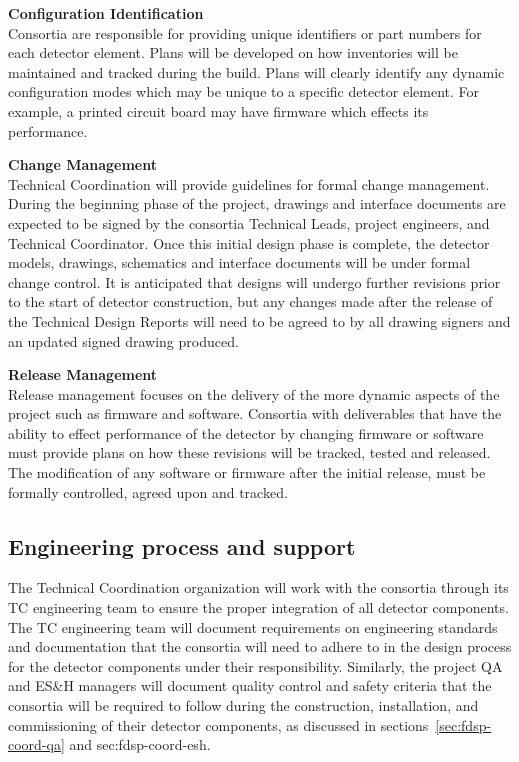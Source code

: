 {\bf Configuration Identification}\\
Consortia are responsible for providing unique identifiers or part
numbers for each detector element.  Plans will be developed on how
inventories will be maintained and tracked during the build.  Plans
will clearly identify any dynamic configuration modes which may be
unique to a specific detector element.  For example, a printed circuit
board may have firmware which effects its performance.

{\bf Change Management}\\
Technical Coordination will provide guidelines
for formal change management.  During the beginning phase of the
project, drawings and interface documents are expected to be signed by
the consortia Technical Leads, project engineers, and Technical
Coordinator.  Once this initial design phase is complete, the detector
models, drawings, schematics and interface documents will be under
formal change control.  It is anticipated that designs will undergo
further revisions prior to the start of detector construction, but any
changes made after the release of the Technical Design Reports will
need to be agreed to by all drawing signers and an updated signed
drawing produced.

{\bf Release Management}\\
Release management focuses on the delivery of the more dynamic aspects
of the project such as firmware and software.  Consortia with
deliverables that have the ability to effect performance of the
detector by changing firmware or software must provide plans on how
these revisions will be tracked, tested and released.  The
modification of any software or firmware after the initial release,
must be formally controlled, agreed upon and tracked.


\subsection{Engineering process and support}
\label{sec:fdsp-coord-integ-engr-proc}
 

The  Technical Coordination organization will work with the
consortia through its TC engineering team to ensure the proper
integration of all detector components.  The TC engineering team
will document requirements on engineering standards and documentation
that the consortia will need to adhere to in the design process for
the detector components under their responsibility.  Similarly, the
project QA and ES\&H managers will document quality control and safety
criteria that the consortia will be required to follow during the
construction, installation, and commissioning of their detector
components, as discussed in sections~\ref{sec:fdsp-coord-qa} and {sec:fdsp-coord-esh}.


